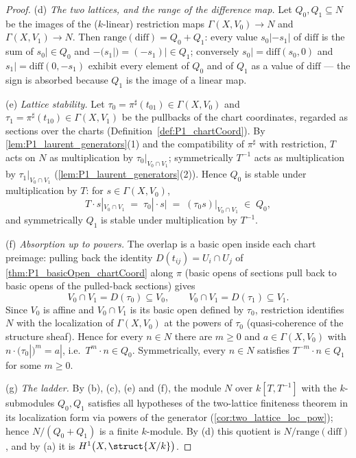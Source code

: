 \begin{proof}
  (d) \emph{The two lattices, and the range of the difference map.} Let
  \(Q_0, Q_1 \subseteq N\) be the images of the (\(k\)-linear) restriction maps
  \(\Gamma(X, V_0) \to N\) and \(\Gamma(X, V_1) \to N\). Then
  \(\mathrm{range}(\mathrm{diff}) = Q_0 + Q_1\): every value
  \(s_0| - s_1|\) of \(\mathrm{diff}\) is the sum of \(s_0| \in Q_0\) and
  \(-(s_1|) = (-s_1)| \in Q_1\); conversely \(s_0| = \mathrm{diff}(s_0, 0) \) and
  \(s_1| = \mathrm{diff}(0, -s_1)\) exhibit every element of \(Q_0\) and of \(Q_1\) as a
  value of \(\mathrm{diff}\) --- the sign is absorbed because \(Q_1\) is the image of a
  linear map.

  (e) \emph{Lattice stability.} Let
  \(\tau_0 = \pi^\sharp(t_{01}) \in \Gamma(X, V_0)\) and
  \(\tau_1 = \pi^\sharp(t_{10}) \in \Gamma(X, V_1)\) be the pullbacks of the chart
  coordinates, regarded as sections over the charts
  (Definition~\ref{def:P1_chartCoord}). By \ref{lem:P1_laurent_generators}(1) and the
  compatibility of \(\pi^\sharp\) with restriction, \(T\) acts on \(N\) as
  multiplication by \(\tau_0|_{V_0 \cap V_1}\); symmetrically \(T^{-1}\) acts as
  multiplication by \(\tau_1|_{V_0 \cap V_1}\) (\ref{lem:P1_laurent_generators}(2)).
  Hence \(Q_0\) is stable under multiplication by \(T\): for \(s \in \Gamma(X, V_0)\),
  \[
    T \cdot s|_{V_0 \cap V_1} \;=\; \tau_0|\cdot s| \;=\; (\tau_0 s)|_{V_0 \cap V_1}
      \;\in\; Q_0,
  \]
  and symmetrically \(Q_1\) is stable under multiplication by \(T^{-1}\).

  (f) \emph{Absorption up to powers.} The overlap is a basic open inside each chart
  preimage: pulling back the identity \(D(t_{ij}) = U_i \cap U_j\) of
  \ref{thm:P1_basicOpen_chartCoord} along \(\pi\) (basic opens of sections pull back to
  basic opens of the pulled-back sections) gives
  \[
    V_0 \cap V_1 = D(\tau_0) \subseteq V_0,
    \qquad
    V_0 \cap V_1 = D(\tau_1) \subseteq V_1 .
  \]
  Since \(V_0\) is affine and \(V_0 \cap V_1\) is its basic open defined by \(\tau_0\),
  restriction identifies \(N\) with the localization of \(\Gamma(X, V_0)\) at the powers
  of \(\tau_0\) (quasi-coherence of the structure sheaf). Hence for every \(n \in N\)
  there are \(m \ge 0\) and \(a \in \Gamma(X, V_0)\) with
  \(n \cdot (\tau_0|)^m = a|\), i.e.\ \(T^m \cdot n \in Q_0\). Symmetrically, every
  \(n \in N\) satisfies \(T^{-m} \cdot n \in Q_1\) for some \(m \ge 0\).

  (g) \emph{The ladder.} By (b), (c), (e) and (f), the module \(N\) over
  \(k[T,T^{-1}]\) with the \(k\)-submodules \(Q_0, Q_1\) satisfies all hypotheses of the
  two-lattice finiteness theorem in its localization form via powers of the generator
  (\ref{cor:two_lattice_loc_pow}); hence \(N/(Q_0 + Q_1)\) is a finite \(k\)-module. By
  (d) this quotient is \(N/\mathrm{range}(\mathrm{diff})\), and by (a) it is
  \(H^1\bigl(X, \struct{X/k}\bigr)\).
\end{proof}

